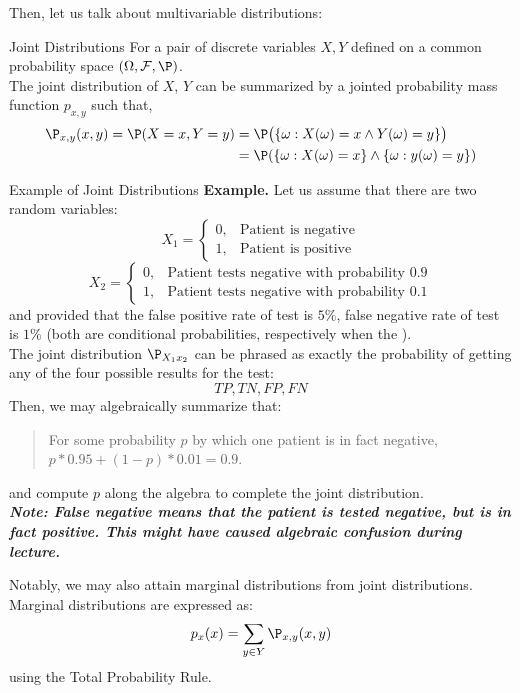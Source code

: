 Then, let us talk about multivariable distributions:
\begin{ln-define}{Joint Distributions}{}
    For a pair of discrete variables $X, Y$ defined on a common probability space $(\Omega, \mathcal{F}, \P)$. \\
    The joint distribution of $X$, $Y$ can be summarized by a jointed probability mass function $p_{x,y}$ such that,
    \begin{align*}
        \P_{x,y}(x, y) = \P(X = x, Y = y)
        &= \P\big( \{\omega : X(\omega) = x \land Y(\omega) = y\} \big) \\
        &= \P(\{\omega : X(\omega) = x\} \land \{\omega : y(\omega) = y\})
    \end{align*}
\end{ln-define}
\begin{ln-explain}{Example of Joint Distributions}{}
    \textbf{Example.} Let us assume that there are two random variables:
    \[
        X_1 = 
        \begin{cases}
            0, &\text{Patient is negative} \\
            1, &\text{Patient is positive}
        \end{cases}
    \]
    \[
        X_2 = 
        \begin{cases}
            0, &\text{Patient tests negative with probability $0.9$} \\
            1, &\text{Patient tests negative with probability $0.1$}
        \end{cases}
    \]
    and provided that the false positive rate of test is $5\%$, false negative rate of test is $1\%$ (both are conditional probabilities, respectively when the ). \\
    The joint distribution $\P_{X_1 x_2}$ can be phrased as exactly the probability of getting any of the four possible results for the test:
    \[TP, TN, FP, FN\]
    Then, we may algebraically summarize that:
    \begin{quote}
        For some probability $p$ by which one patient is in fact negative, $p * 0.95 + (1 - p) * 0.01 = 0.9$.
    \end{quote}
    and compute $p$ along the algebra to complete the joint distribution. \\
    \textbf{\textit{Note: False negative means that the patient is tested negative, but is in fact positive. This might have caused algebraic confusion during lecture.}}
\end{ln-explain}
Notably, we may also attain marginal distributions from joint distributions. Marginal distributions are expressed as:
\[p_x(x) = \sum_{y \in Y} \P_{x,y}(x, y)\]
using the Total Probability Rule. \\

